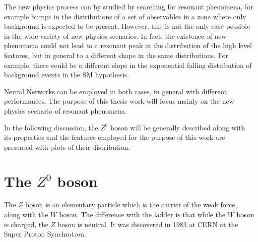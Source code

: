 The new physics process can by studied by searching for resonant phenomena, for example bumps in the distributions of a set of observables in a zone where only background is expected to be present. However, this is not the only case possible in the wide variety of new physics scenarios. In fact, the existence of new phenomena could not lead to a resonant peak in the distribution of the high level features, but in general to a different shape in the same distributions. For example, there could be a different slope in the exponential falling distribution of background events in the SM hypothesis.

Neural Networks can be employed in both cases, in general with different performances. The purpose of this thesis work will focus mainly on the new physics scenario of resonant phenomena.

In the following discussion, the $Z^{0}$ boson will be generally described along with its properties and the features employed for the purpose of this work are presented with plots of their distribution.





\section{The $Z^{0}$ boson}
The $Z$ boson is an elementary particle which is the carrier of the weak force, along with the $W$ boson. The difference with the ladder is that while the $W$ boson is charged, the $Z$ boson is neutral. It was discovered in 1983 at CERN at the Super Proton Synchrotron.

